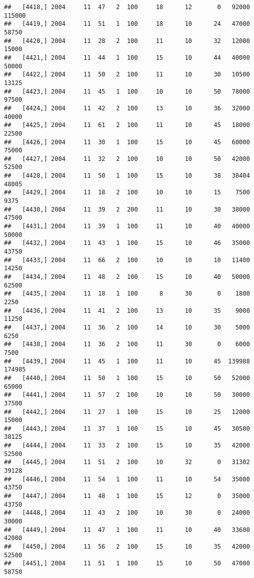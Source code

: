 \documentclass{article}\usepackage[]{graphicx}\usepackage[]{color}
\makeatletter
\newenvironment{kframe}{%
 \def\at@end@of@kframe{}%
 \ifinner\ifhmode%
  \def\at@end@of@kframe{\end{minipage}}%
  \begin{minipage}{\columnwidth}%
 \fi\fi%
 \def\FrameCommand##1{\hskip\@totalleftmargin \hskip-\fboxsep
 \colorbox{shadecolor}{##1}\hskip-\fboxsep
     \hskip-\linewidth \hskip-\@totalleftmargin \hskip\columnwidth}%
 \MakeFramed {\advance\hsize-\width
   \@totalleftmargin\z@ \linewidth\hsize
   \@setminipage}}%
 {\par\unskip\endMakeFramed%
 \at@end@of@kframe}
\newenvironment{knitrout}{}{} %
\makeatother
\begin{document}
\begin{knitrout}
\begin{kframe}
\begin{verbatim}
##   [4418,] 2004     11  47   2  100     18      12       0   92000  115000
##   [4419,] 2004     11  51   1  100     18      10      24   47000   58750
##   [4420,] 2004     11  28   2  100     11      10      32   12000   15000
##   [4421,] 2004     11  44   1  100     15      10      44   40000   50000
##   [4422,] 2004     11  50   2  100     11      10      30   10500   13125
##   [4423,] 2004     11  45   1  100     10      10      50   78000   97500
##   [4424,] 2004     11  42   2  100     13      10      36   32000   40000
##   [4425,] 2004     11  61   2  100     11      10      45   18000   22500
##   [4426,] 2004     11  30   1  100     15      10      45   60000   75000
##   [4427,] 2004     11  32   2  100     10      10      50   42000   52500
##   [4428,] 2004     11  50   1  100     15      10      38   38404   48005
##   [4429,] 2004     11  18   2  100     10      10      15    7500    9375
##   [4430,] 2004     11  39   2  200     11      10      30   38000   47500
##   [4431,] 2004     11  39   1  100     11      10      40   40000   50000
##   [4432,] 2004     11  43   1  100     15      10      46   35000   43750
##   [4433,] 2004     11  66   2  100     10      10      10   11400   14250
##   [4434,] 2004     11  48   2  100     15      10      40   50000   62500
##   [4435,] 2004     11  18   1  100      8      30       0    1800    2250
##   [4436,] 2004     11  41   2  100     13      10      35    9000   11250
##   [4437,] 2004     11  36   2  100     14      10      30    5000    6250
##   [4438,] 2004     11  36   2  100     11      30       0    6000    7500
##   [4439,] 2004     11  45   1  100     11      10      45  139988  174985
##   [4440,] 2004     11  50   1  100     15      10      50   52000   65000
##   [4441,] 2004     11  57   2  100     10      10      50   30000   37500
##   [4442,] 2004     11  27   1  100     15      10      25   12000   15000
##   [4443,] 2004     11  37   1  100     15      10      45   30500   38125
##   [4444,] 2004     11  33   2  100     15      10      35   42000   52500
##   [4445,] 2004     11  51   2  100     10      32       0   31302   39128
##   [4446,] 2004     11  54   1  100     11      10      54   35000   43750
##   [4447,] 2004     11  48   1  100     15      12       0   35000   43750
##   [4448,] 2004     11  43   2  100     10      30       0   24000   30000
##   [4449,] 2004     11  47   1  100     11      10      40   33600   42000
##   [4450,] 2004     11  56   2  100     15      10      35   42000   52500
##   [4451,] 2004     11  51   1  100     15      10      50   47000   58750

\end{verbatim}
\end{kframe}
\end{knitrout}
\end{document}
